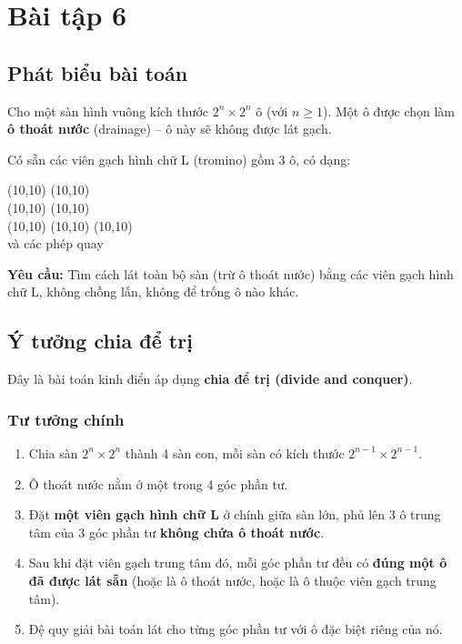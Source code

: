 \documentclass{article}
\begin{document}
\section{Bài tập 6}

\subsection{Phát biểu bài toán}

Cho một sàn hình vuông kích thước \(2^n \times 2^n\) ô (với \(n \ge 1\)). Một ô được chọn làm \textbf{ô thoát nước} (drainage) – ô này sẽ không được lát gạch.  

Có sẵn các viên gạch hình chữ L (tromino) gồm 3 ô, có dạng:

\begin{center}
\framebox(10,10){} \framebox(10,10){} \\
\framebox(10,10){}  \qquad
\framebox(10,10){}  \\
\framebox(10,10){} \framebox(10,10){} \qquad
{} \framebox(10,10){} \\
và các phép quay
\end{center}

\textbf{Yêu cầu:} Tìm cách lát toàn bộ sàn (trừ ô thoát nước) bằng các viên gạch hình chữ L, không chồng lấn, không để trống ô nào khác.

\subsection{Ý tưởng chia để trị}

Đây là bài toán kinh điển áp dụng \textbf{chia để trị (divide and conquer)}.

\subsubsection{Tư tưởng chính}
\begin{enumerate}
    \item Chia sàn \(2^n \times 2^n\) thành 4 sàn con, mỗi sàn có kích thước \(2^{n-1} \times 2^{n-1}\).
    \item Ô thoát nước nằm ở một trong 4 góc phần tư.
    \item Đặt \textbf{một viên gạch hình chữ L} ở chính giữa sàn lớn, phủ lên 3 ô trung tâm của 3 góc phần tư \textbf{không chứa ô thoát nước}.
    \item Sau khi đặt viên gạch trung tâm đó, mỗi góc phần tư đều có \textbf{đúng một ô đã được lát sẵn} (hoặc là ô thoát nước, hoặc là ô thuộc viên gạch trung tâm).
    \item Đệ quy giải bài toán lát cho từng góc phần tư với ô đặc biệt riêng của nó.
\end{enumerate}
\end{document}
